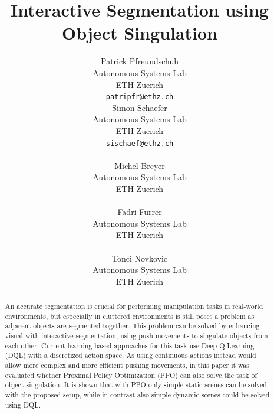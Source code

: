 \documentclass{article}
\title{Interactive Segmentation using Object Singulation}
\author{
    Patrick Pfreundschuh\\
    Autonomous Systems Lab\\
    ETH Zuerich \\
    \texttt{patripfr@ethz.ch} \\
    \And
    Simon Schaefer \\
    Autonomous Systems Lab\\
    ETH Zuerich \\
    \texttt{sischaef@ethz.ch} \\
    \AND
    \Coauthor \\
    Michel Breyer \\
    Autonomous Systems Lab\\
    ETH Zuerich \\
    \And
    \Coauthor \\
    Fadri Furrer \\
    Autonomous Systems Lab\\
    ETH Zuerich \\
    \And
    \Coauthor \\
    Tonci Novkovic \\
    Autonomous Systems Lab\\
    ETH Zuerich \\
}
\begin{document}
\maketitle


\begin{abstract}
An accurate segmentation is crucial for performing manipulation tasks in real-world environments, but especially in cluttered environments is still poses a problem as adjacent objects are segmented together. This problem can be solved by enhancing visual with interactive segmentation, using push movements to singulate objects from each other. Current learning based approaches for this task use Deep Q-Learning (DQL) with a discretized action space. As using continuous actions instead would allow more complex and more efficient pushing movements, in this paper it was evaluated whether Proximal Policy Optimization (PPO) can also solve the task of object singulation. It is shown that with PPO only simple static scenes can be solved with the proposed setup, while in contrast also simple dynamic scenes could be solved using DQL.  
\end{abstract}


\end{document}
